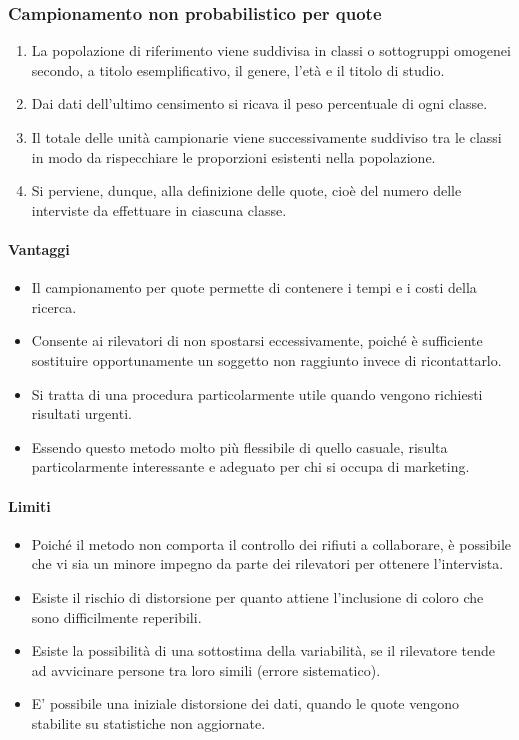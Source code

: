 \subsubsection{Campionamento non probabilistico per quote}
\begin{enumerate}
	\item La popolazione di riferimento viene suddivisa in classi o sottogruppi omogenei secondo, a titolo esemplificativo, il genere, l’età e il titolo di studio.
	\item Dai dati dell'ultimo censimento si ricava il peso percentuale di ogni classe.
	\item Il totale delle unità campionarie viene successivamente suddiviso tra le classi in modo da rispecchiare le proporzioni esistenti nella popolazione.
	\item Si perviene, dunque, alla definizione delle quote, cioè del numero delle interviste da effettuare in ciascuna classe.
\end{enumerate}

\paragraph{Vantaggi} 
\begin{itemize}
	\item Il campionamento per quote permette di contenere i tempi e i costi della ricerca.
	\item Consente ai rilevatori di non spostarsi eccessivamente, poiché è sufficiente sostituire opportunamente un soggetto non raggiunto invece di ricontattarlo.
	\item Si tratta di una procedura particolarmente utile quando vengono richiesti risultati urgenti.
	\item Essendo questo metodo molto più flessibile di quello casuale, risulta particolarmente interessante e adeguato per chi si occupa di marketing.
\end{itemize}

\paragraph{Limiti} 
\begin{itemize}
	\item Poiché il metodo non comporta il controllo dei rifiuti a collaborare, è possibile che vi sia un minore impegno da parte dei rilevatori per ottenere l’intervista.
	\item Esiste il rischio di distorsione per quanto attiene l’inclusione di coloro che sono difficilmente reperibili.
	\item Esiste la possibilità di una sottostima della variabilità, se il rilevatore tende ad avvicinare persone tra loro simili (errore sistematico).
	\item E’ possibile una iniziale distorsione dei dati, quando le quote vengono stabilite su statistiche non aggiornate.
\end{itemize}

